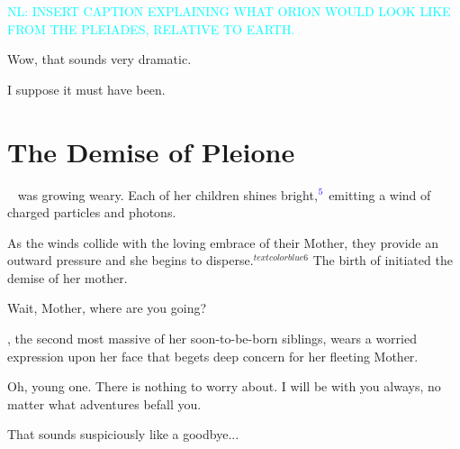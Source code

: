 \documentclass[main.tex]{subfiles}
\begin{document}
\textcolor{cyan}{NL:  INSERT CAPTION EXPLAINING WHAT ORION WOULD LOOK LIKE FROM THE PLEIADES, RELATIVE TO EARTH.}

\par \Maia Wow, that sounds very dramatic.

\par \Pleione I suppose it must have been.

\section{The Demise of Pleione} \label{demise}

\par \nar \rmpleione~ was growing weary.  Each of her children shines bright,$^{\textcolor{blue}{5}}$ emitting a wind of charged particles and photons.

\par \nar As the winds collide with the loving embrace of their Mother, they provide an outward pressure and she begins to disperse.$^{textcolor{blue}{6}}$  The birth of \rmmaia initiated the demise of her mother.  

\par \Maia Wait, Mother, where are you going?  

\par \nar \rmmaia, the second most massive of her soon-to-be-born siblings, wears a worried expression upon her face that begets deep concern for her fleeting Mother.  





\par \Pleione Oh, young one.  There is nothing to worry about.  I will be with you always, no matter what adventures befall you.  

\par \Maia That sounds suspiciously like a goodbye...
\end{document}
